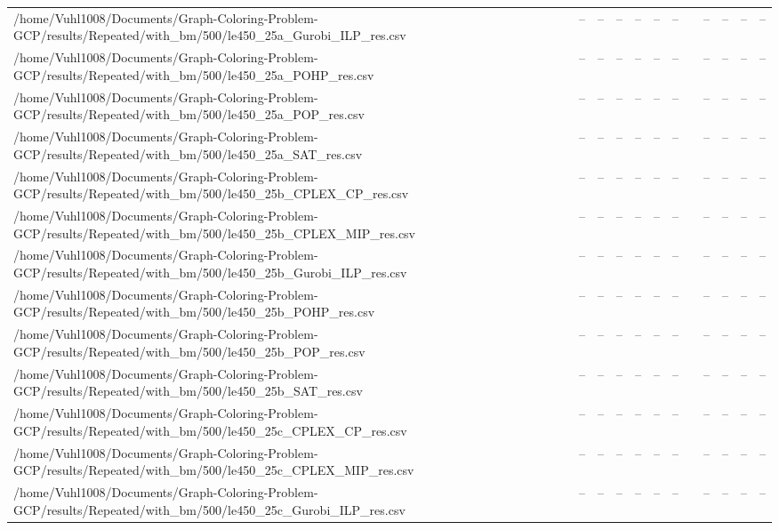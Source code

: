 \begin{table}[htbp]
\begin{tabular}{llllllllllll}
/home/Vuhl1008/Documents/Graph-Coloring-Problem-GCP/results/Repeated/with\_bm/500/le450\_25a\_Gurobi\_ILP\_res.csv & -- & -- & -- & -- & -- & -- & {} & -- & -- & -- & -- \\
/home/Vuhl1008/Documents/Graph-Coloring-Problem-GCP/results/Repeated/with\_bm/500/le450\_25a\_POHP\_res.csv & -- & -- & -- & -- & -- & -- & {} & -- & -- & -- & -- \\
/home/Vuhl1008/Documents/Graph-Coloring-Problem-GCP/results/Repeated/with\_bm/500/le450\_25a\_POP\_res.csv & -- & -- & -- & -- & -- & -- & {} & -- & -- & -- & -- \\
/home/Vuhl1008/Documents/Graph-Coloring-Problem-GCP/results/Repeated/with\_bm/500/le450\_25a\_SAT\_res.csv & -- & -- & -- & -- & -- & -- & {} & -- & -- & -- & -- \\
/home/Vuhl1008/Documents/Graph-Coloring-Problem-GCP/results/Repeated/with\_bm/500/le450\_25b\_CPLEX\_CP\_res.csv & -- & -- & -- & -- & -- & -- & {} & -- & -- & -- & -- \\
/home/Vuhl1008/Documents/Graph-Coloring-Problem-GCP/results/Repeated/with\_bm/500/le450\_25b\_CPLEX\_MIP\_res.csv & -- & -- & -- & -- & -- & -- & {} & -- & -- & -- & -- \\
/home/Vuhl1008/Documents/Graph-Coloring-Problem-GCP/results/Repeated/with\_bm/500/le450\_25b\_Gurobi\_ILP\_res.csv & -- & -- & -- & -- & -- & -- & {} & -- & -- & -- & -- \\
/home/Vuhl1008/Documents/Graph-Coloring-Problem-GCP/results/Repeated/with\_bm/500/le450\_25b\_POHP\_res.csv & -- & -- & -- & -- & -- & -- & {} & -- & -- & -- & -- \\
/home/Vuhl1008/Documents/Graph-Coloring-Problem-GCP/results/Repeated/with\_bm/500/le450\_25b\_POP\_res.csv & -- & -- & -- & -- & -- & -- & {} & -- & -- & -- & -- \\
/home/Vuhl1008/Documents/Graph-Coloring-Problem-GCP/results/Repeated/with\_bm/500/le450\_25b\_SAT\_res.csv & -- & -- & -- & -- & -- & -- & {} & -- & -- & -- & -- \\
/home/Vuhl1008/Documents/Graph-Coloring-Problem-GCP/results/Repeated/with\_bm/500/le450\_25c\_CPLEX\_CP\_res.csv & -- & -- & -- & -- & -- & -- & {} & -- & -- & -- & -- \\
/home/Vuhl1008/Documents/Graph-Coloring-Problem-GCP/results/Repeated/with\_bm/500/le450\_25c\_CPLEX\_MIP\_res.csv & -- & -- & -- & -- & -- & -- & {} & -- & -- & -- & -- \\
/home/Vuhl1008/Documents/Graph-Coloring-Problem-GCP/results/Repeated/with\_bm/500/le450\_25c\_Gurobi\_ILP\_res.csv & -- & -- & -- & -- & -- & -- & {} & -- & -- & -- & -- \\

\end{tabular}
\end{table}
